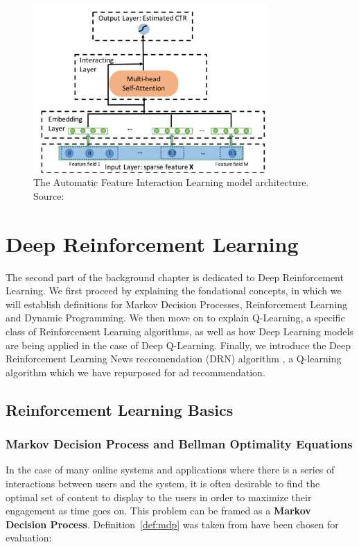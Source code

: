 \documentclass{mldsmsc}
\begin{document}
\begin{figure}[h]
    \centering
    \includegraphics[width=0.8\textwidth]{../figures/autoint.png}
    \caption{The Automatic Feature Interaction Learning model architecture. Source: \citep{RefWorks:song2019autoint}}
    \label{fig:autoint}
\end{figure}


\section{Deep Reinforcement Learning}

The second part of the background chapter is dedicated to Deep Reinforcement Learning. We first
proceed by explaining the fondational concepts, in which we will establish definitions for
Markov Decision Processes, Reinforcement Learning and Dynamic Programming. We then move on to explain
Q-Learning, a specific class of Reinforcement Learning algorithms, as well as how Deep Learning
models are being applied in the case of Deep Q-Learning. Finally, we introduce the Deep Reinforcement
Learning News reccomendation (DRN) algorithm \citep{RefWorks:zheng2018drn:}, a Q-learning algorithm
which we have repurposed for ad recommendation.

\subsection{Reinforcement Learning Basics}

\subsubsection{Markov Decision Process and Bellman Optimality Equations}

In the case of many online systems and applications where there is a series of interactions between
users and the system, it is often desirable to find the optimal set of content to display to the
users in order to maximize their engagement as time goes on. This problem can be framed as a
\textbf{Markov Decision Process}. Definition~\ref{def:mdp} was taken from \citep{pike-burke2024LearnigAgents}
have been chosen for evaluation:
\end{document}
